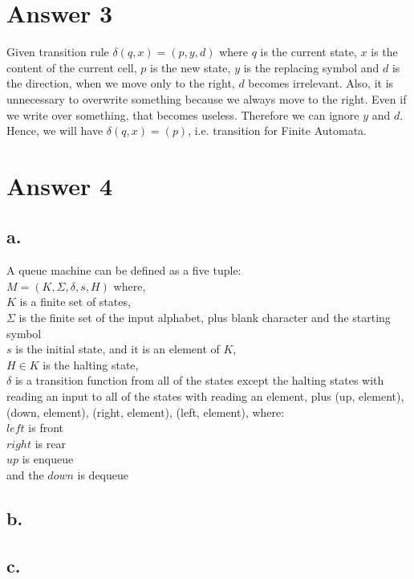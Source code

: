 \documentclass[12pt]{article}
\begin{document}
\section*{Answer 3}

Given transition rule $\delta(q,x) = (p,y,d)$ where $q$ is the current state, $x$ is the content of the current cell, $p$ is the new state, $y$ is the replacing symbol and $d$ is the direction, when we move only to the right, $d$ becomes irrelevant. Also, it is unnecessary to overwrite something because we always move to the right. Even if we write over something, that becomes useless. Therefore we can ignore $y$ and $d$. Hence, we will have $\delta(q,x) = (p)$, i.e. transition for Finite Automata.

\section*{Answer 4}

\subsection*{a.}
A queue machine can be defined as a five tuple:\\
$M = (K,\Sigma, \delta, s, H)$ where,
\\
$K$ is a finite set of states,\\
$\Sigma$ is the finite set of the input alphabet, plus blank character and the starting symbol\\
$s$ is the initial state, and it is an element of $K$,\\
$H \in K$ is the halting state,\\
$\delta$ is a transition function from all of the states except the halting states with reading an input to all of the states with reading an element, plus (up, element),(down, element), (right, element), (left, element), where:\\
$left$ is front\\
$right$ is rear\\
$up$ is enqueue\\
and the $down$ is dequeue\\

\subsection*{b.}

\subsection*{c.}
\end{document}
